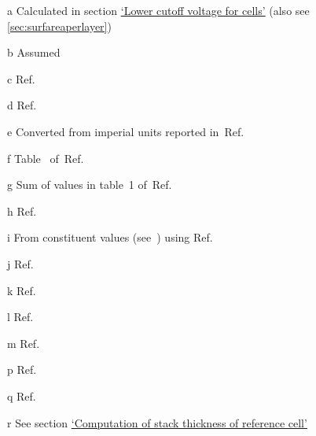\begin{table}[!htbp]
\begin{threeparttable}
        \smallskip
        \vspace*{-5pt}
        \begin{tablenotes}
            \begin{footnotesize}
            \item[a] Calculated in section \hyperlink{celllowercutoff}{`Lower cutoff voltage for cells'} (also see \cref{sec:surfareaperlayer})
            \item[b] Assumed
            \item[c] Ref.~\cite{Sae2010}
            \item[d] Ref.~\cite{Kizilel2009}
            \item[e] Converted from imperial units reported in~Ref.~\cite{GMBoltBatteryDims}
		    \item[f] Table~ of~Ref.~\cite{Groger2015} \\
            \item[g] Sum of values in table~1 of~Ref.~\cite{Svens2013}
            \item[h] Ref.~\cite{Chen2005}
            \item[i] From constituent values (see~\cite{Svens2013}) using Ref.~\cite{martienssen2006springer} \\
            \item[j] Ref.~\cite{Guo2010}
            \item[k] Ref.~\cite{Jeon2011}
            \item[l] Ref.~\cite{Worwood2017,Song2000}
            \item[m] Ref.~\cite{Kim2009}
            \item[p] Ref.~\cite{Northrop2011}
            \item[q] Ref.~\cite{Subramanian2009} \\
            \item[r] See section \hyperlink{stackthickness}{`Computation of stack thickness of reference cell'}
            \end{footnotesize}
        \end{tablenotes}
    \end{threeparttable}
\end{table}

